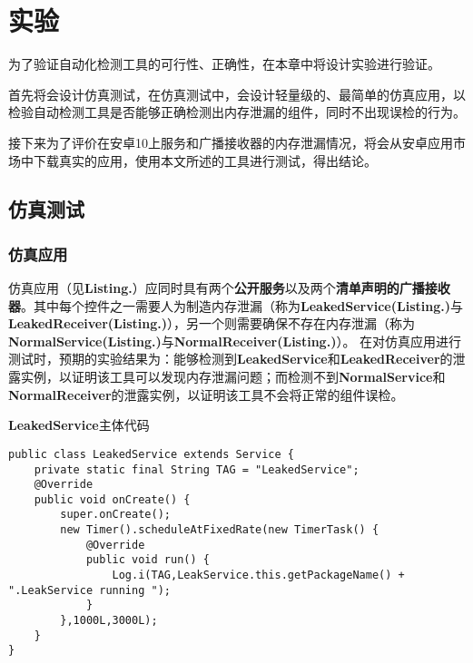 
\chapter{实验}\label{chapter_experiment}
为了验证自动化检测工具的可行性、正确性，在本章中将设计实验进行验证。

首先将会设计仿真测试，在仿真测试中，会设计轻量级的、最简单的仿真应用，以检验自动检测工具是否能够正确检测出内存泄漏的组件，同时不出现误检的行为。

接下来为了评价在安卓10上服务和广播接收器的内存泄漏情况，将会从安卓应用市场中下载真实的应用，使用本文所述的工具进行测试，得出结论。
\section{仿真测试}

\subsection{仿真应用}

仿真应用（见\textbf{Listing.}\redbf{\ref{code: manifest}}）应同时具有两个\textbf{公开服务}以及两个\textbf{清单声明的广播接收器}。其中每个控件之一需要人为制造内存泄漏（称为\textbf{LeakedService(Listing.\redbf{\ref{code:LeakedService}})}与\textbf{LeakedReceiver(Listing.\redbf{\ref{code:LeakedReceiver}})}），另一个则需要确保不存在内存泄漏（称为\textbf{NormalService(Listing.\redbf{\ref{code:Normal}})}与\textbf{NormalReceiver(Listing.\redbf{\ref{code:Normal}})}）。
在对仿真应用进行测试时，预期的实验结果为：能够检测到\textbf{LeakedService}和\textbf{LeakedReceiver}的泄露实例，以证明该工具可以发现内存泄漏问题；而检测不到\textbf{NormalService}和\textbf{NormalReceiver}的泄露实例，以证明该工具不会将正常的组件误检。


\begin{listing}[htbp]
	\centering
	\caption{\textbf{LeakedService}主体代码}
	\begin{verbatim}
public class LeakedService extends Service {
	private static final String TAG = "LeakedService";
	@Override
	public void onCreate() {
		super.onCreate();
		new Timer().scheduleAtFixedRate(new TimerTask() {
			@Override
			public void run() {
				Log.i(TAG,LeakService.this.getPackageName() + ".LeakService running ");
			}
		},1000L,3000L);
	}
}	
	\end{verbatim}
	\label{code:LeakedService}
\end{listing}

